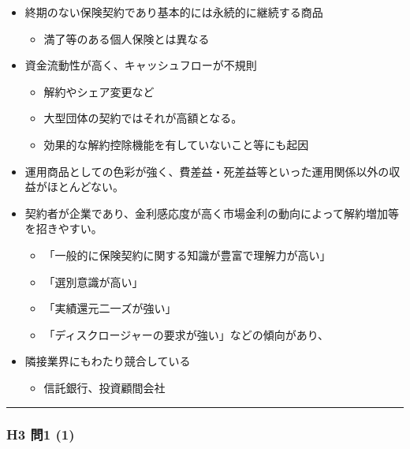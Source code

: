 \documentclass[]{article}
\begin{document}
\begin{itemize}
\tightlist
\item
  終期のない保険契約であり基本的には永続的に継続する商品

  \begin{itemize}
  \tightlist
  \item
    満了等のある個人保険とは異なる
  \end{itemize}
\item
  資金流動性が高く、キャッシュフローが不規則

  \begin{itemize}
  \tightlist
  \item
    解約やシェア変更など
  \item
    大型団体の契約ではそれが高額となる。
  \item
    効果的な解約控除機能を有していないこと等にも起因
  \end{itemize}
\item
  運用商品としての色彩が強く、費差益・死差益等といった運用関係以外の収益がほとんどない。
\item
  契約者が企業であり、金利感応度が高く市場金利の動向によって解約増加等を招きやすい。

  \begin{itemize}
  \tightlist
  \item
    「一般的に保険契約に関する知識が豊富で理解力が高い」
  \item
    「選別意識が高い」
  \item
    「実績還元二一ズが強い」
  \item
    「ディスクロージャーの要求が強い」などの傾向があり、
  \end{itemize}
\item
  隣接業界にもわたり競合している

  \begin{itemize}
  \tightlist
  \item
    信託銀行、投資顧間会社
  \end{itemize}
\end{itemize}

\begin{center}\rule{0.5\linewidth}{0.5pt}\end{center}

\hypertarget{h3-ux554f1-1}{%
\subsubsection{H3 問1 (1)}\label{h3-ux554f1-1}}
\end{document}
